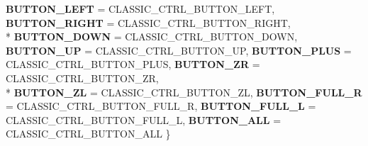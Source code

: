 \begin{DoxyCompactItemize}
{\bfseries B\-U\-T\-T\-O\-N\-\_\-\-L\-E\-F\-T} =  C\-L\-A\-S\-S\-I\-C\-\_\-\-C\-T\-R\-L\-\_\-\-B\-U\-T\-T\-O\-N\-\_\-\-L\-E\-F\-T, 
{\bfseries B\-U\-T\-T\-O\-N\-\_\-\-R\-I\-G\-H\-T} =  C\-L\-A\-S\-S\-I\-C\-\_\-\-C\-T\-R\-L\-\_\-\-B\-U\-T\-T\-O\-N\-\_\-\-R\-I\-G\-H\-T, 
\\*
{\bfseries B\-U\-T\-T\-O\-N\-\_\-\-D\-O\-W\-N} =  C\-L\-A\-S\-S\-I\-C\-\_\-\-C\-T\-R\-L\-\_\-\-B\-U\-T\-T\-O\-N\-\_\-\-D\-O\-W\-N, 
{\bfseries B\-U\-T\-T\-O\-N\-\_\-\-U\-P} =  C\-L\-A\-S\-S\-I\-C\-\_\-\-C\-T\-R\-L\-\_\-\-B\-U\-T\-T\-O\-N\-\_\-\-U\-P, 
{\bfseries B\-U\-T\-T\-O\-N\-\_\-\-P\-L\-U\-S} =  C\-L\-A\-S\-S\-I\-C\-\_\-\-C\-T\-R\-L\-\_\-\-B\-U\-T\-T\-O\-N\-\_\-\-P\-L\-U\-S, 
{\bfseries B\-U\-T\-T\-O\-N\-\_\-\-Z\-R} =  C\-L\-A\-S\-S\-I\-C\-\_\-\-C\-T\-R\-L\-\_\-\-B\-U\-T\-T\-O\-N\-\_\-\-Z\-R, 
\\*
{\bfseries B\-U\-T\-T\-O\-N\-\_\-\-Z\-L} =  C\-L\-A\-S\-S\-I\-C\-\_\-\-C\-T\-R\-L\-\_\-\-B\-U\-T\-T\-O\-N\-\_\-\-Z\-L, 
{\bfseries B\-U\-T\-T\-O\-N\-\_\-\-F\-U\-L\-L\-\_\-\-R} =  C\-L\-A\-S\-S\-I\-C\-\_\-\-C\-T\-R\-L\-\_\-\-B\-U\-T\-T\-O\-N\-\_\-\-F\-U\-L\-L\-\_\-\-R, 
{\bfseries B\-U\-T\-T\-O\-N\-\_\-\-F\-U\-L\-L\-\_\-\-L} =  C\-L\-A\-S\-S\-I\-C\-\_\-\-C\-T\-R\-L\-\_\-\-B\-U\-T\-T\-O\-N\-\_\-\-F\-U\-L\-L\-\_\-\-L, 
{\bfseries B\-U\-T\-T\-O\-N\-\_\-\-A\-L\-L} =  C\-L\-A\-S\-S\-I\-C\-\_\-\-C\-T\-R\-L\-\_\-\-B\-U\-T\-T\-O\-N\-\_\-\-A\-L\-L
 \}
\end{DoxyCompactItemize}
